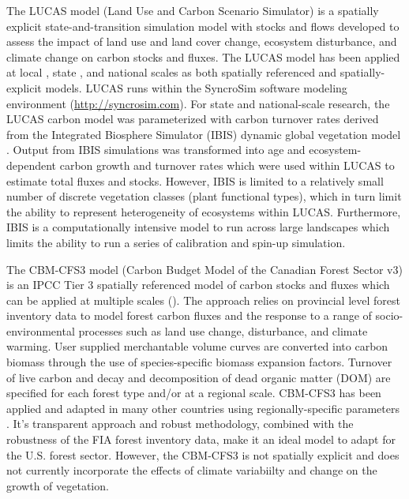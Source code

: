 \documentclass[
]{book}
\begin{document}
The LUCAS model (Land Use and Carbon Scenario Simulator) is a spatially explicit state-and-transition simulation model with stocks and flows \citep[\citet{daniel2018integrating}]{daniel2016state} developed to assess the impact of land use and land cover change, ecosystem disturbance, and climate change on carbon stocks and fluxes. The LUCAS model has been applied at local \citep{sleeter2017carbon}, state \citep{sleeter2019effects}, and national \citep{sleeter2018effects} scales as both spatially referenced and spatially-explicit models. LUCAS runs within the SyncroSim software modeling environment (\url{http://syncrosim.com}). For state and national-scale research, the LUCAS carbon model was parameterized with carbon turnover rates derived from the Integrated Biosphere Simulator (IBIS) dynamic global vegetation model \citep{liu2020critical}. Output from IBIS simulations was transformed into age and ecosystem-dependent carbon growth and turnover rates which were used within LUCAS to estimate total fluxes and stocks. However, IBIS is limited to a relatively small number of discrete vegetation classes (plant functional types), which in turn limit the ability to represent heterogeneity of ecosystems within LUCAS. Furthermore, IBIS is a computationally intensive model to run across large landscapes which limits the ability to run a series of calibration and spin-up simulation.

The CBM-CFS3 model (Carbon Budget Model of the Canadian Forest Sector v3) is an IPCC Tier 3 spatially referenced model of carbon stocks and fluxes which can be applied at multiple scales (\citet{kurz2009cbm}). The approach relies on provincial level forest inventory data to model forest carbon fluxes and the response to a range of socio-environmental processes such as land use change, disturbance, and climate warming. User supplied merchantable volume curves are converted into carbon biomass through the use of species-specific biomass expansion factors. Turnover of live carbon and decay and decomposition of dead organic matter (DOM) are specified for each forest type and/or at a regional scale. CBM-CFS3 has been applied and adapted in many other countries using regionally-specific parameters \citep{pilli2013application, kim2017estimating, jevvsenak2020effect, pilli2018carbon}. It's transparent approach and robust methodology, combined with the robustness of the FIA forest inventory data, make it an ideal model to adapt for the U.S. forest sector. However, the CBM-CFS3 is not spatially explicit and does not currently incorporate the effects of climate variabiilty and change on the growth of vegetation.
\end{document}
